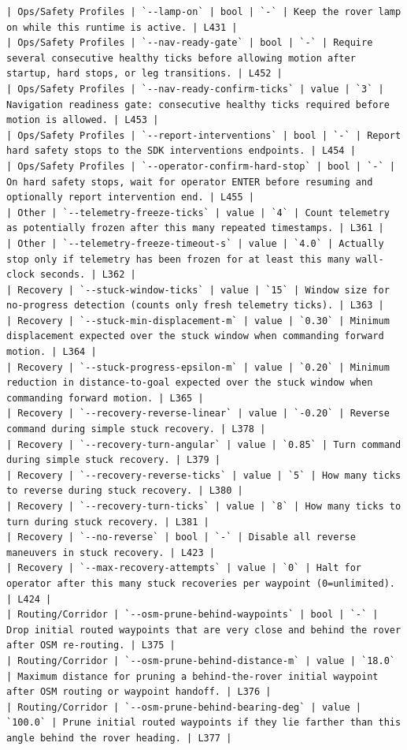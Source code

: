 \documentclass[11pt]{article}
\begin{document}
\begin{lstlisting}
| Ops/Safety Profiles | `--lamp-on` | bool | `-` | Keep the rover lamp on while this runtime is active. | L431 |
| Ops/Safety Profiles | `--nav-ready-gate` | bool | `-` | Require several consecutive healthy ticks before allowing motion after startup, hard stops, or leg transitions. | L452 |
| Ops/Safety Profiles | `--nav-ready-confirm-ticks` | value | `3` | Navigation readiness gate: consecutive healthy ticks required before motion is allowed. | L453 |
| Ops/Safety Profiles | `--report-interventions` | bool | `-` | Report hard safety stops to the SDK interventions endpoints. | L454 |
| Ops/Safety Profiles | `--operator-confirm-hard-stop` | bool | `-` | On hard safety stops, wait for operator ENTER before resuming and optionally report intervention end. | L455 |
| Other | `--telemetry-freeze-ticks` | value | `4` | Count telemetry as potentially frozen after this many repeated timestamps. | L361 |
| Other | `--telemetry-freeze-timeout-s` | value | `4.0` | Actually stop only if telemetry has been frozen for at least this many wall-clock seconds. | L362 |
| Recovery | `--stuck-window-ticks` | value | `15` | Window size for no-progress detection (counts only fresh telemetry ticks). | L363 |
| Recovery | `--stuck-min-displacement-m` | value | `0.30` | Minimum displacement expected over the stuck window when commanding forward motion. | L364 |
| Recovery | `--stuck-progress-epsilon-m` | value | `0.20` | Minimum reduction in distance-to-goal expected over the stuck window when commanding forward motion. | L365 |
| Recovery | `--recovery-reverse-linear` | value | `-0.20` | Reverse command during simple stuck recovery. | L378 |
| Recovery | `--recovery-turn-angular` | value | `0.85` | Turn command during simple stuck recovery. | L379 |
| Recovery | `--recovery-reverse-ticks` | value | `5` | How many ticks to reverse during stuck recovery. | L380 |
| Recovery | `--recovery-turn-ticks` | value | `8` | How many ticks to turn during stuck recovery. | L381 |
| Recovery | `--no-reverse` | bool | `-` | Disable all reverse maneuvers in stuck recovery. | L423 |
| Recovery | `--max-recovery-attempts` | value | `0` | Halt for operator after this many stuck recoveries per waypoint (0=unlimited). | L424 |
| Routing/Corridor | `--osm-prune-behind-waypoints` | bool | `-` | Drop initial routed waypoints that are very close and behind the rover after OSM re-routing. | L375 |
| Routing/Corridor | `--osm-prune-behind-distance-m` | value | `18.0` | Maximum distance for pruning a behind-the-rover initial waypoint after OSM routing or waypoint handoff. | L376 |
| Routing/Corridor | `--osm-prune-behind-bearing-deg` | value | `100.0` | Prune initial routed waypoints if they lie farther than this angle behind the rover heading. | L377 |

\end{lstlisting}
\end{document}
